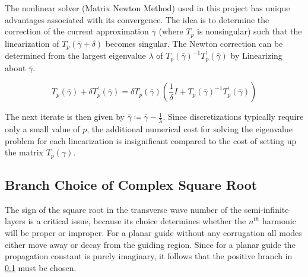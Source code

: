 The nonlinear solver (Matrix Newton Method) used in this project has
unique advantages associated with its convergence. The idea is to
determine the correction of the current approximation $\bar{\gamma}$
(where $T _p$ is nonsingular) such that the linearization of
$T_p(\bar{\gamma}+\delta)$ becomes singular. The Newton correction can
be determined from the largest eigenvalue $\lambda$ of
$T_p(\bar{\gamma})^{-1} T_p^\prime (\bar{\gamma})$ by Linearizing about
$\bar{\gamma}$.

\begin{equation}
T_p(\bar{\gamma})+\delta T_p^\prime (\bar{\gamma}) = \delta T_p(\bar{\gamma})
(\frac{1}{\delta} I + T_p(\bar{\gamma})^{-1} T_p^\prime (\bar{\gamma}))
\end{equation}

The next iterate is then given by
$\bar{\gamma} \coloneqq \bar{\gamma}-\frac{1}{\lambda}$. Since discretizations typically
require only a small value of $p$, the additional numerical cost for
solving the eigenvalue problem for each linearization is insignificant
compared to the cost of setting up the matrix $T_p(\gamma)$.

\subsection{Branch Choice of Complex Square Root}
The sign of the square root in the transverse wave number of the
semi-infinite layers is a critical issue, because its choice
determines whether the $n^{th}$ harmonic will be proper or improper.
For a planar guide without any corrugation all modes either move away
or decay from the guiding region. Since for a planar guide the
propagation constant is purely imaginary, it follows that the positive
branch in \ref{} must be chosen.

